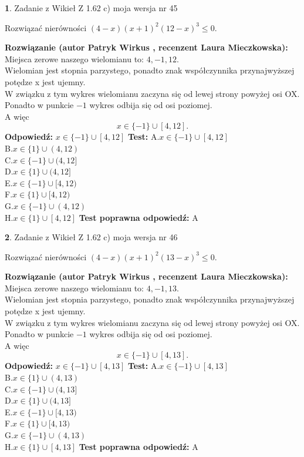 \documentclass[12pt, a4paper]{article}
\theoremstyle{definition} %
\newtheorem{zad}{}
\newcommand{\zadStart}[1]{\begin{zad}#1\newline}
\newcommand{\zadStop}{\end{zad}}
\newcommand{\rozwStart}[2]{\noindent \textbf{Rozwiązanie (autor #1 , recenzent #2): }\newline}
\newcommand{\rozwStop}{\newline}
\newcommand{\odpStart}{\noindent \textbf{Odpowiedź:}\newline}
\newcommand{\odpStop}{\newline}
\newcommand{\testStart}{\noindent \textbf{Test:}\newline}
\newcommand{\testStop}{\newline}
\newcommand{\kluczStart}{\noindent \textbf{Test poprawna odpowiedź:}\newline}
\newcommand{\kluczStop}{\newline}
\begin{document}
\zadStart{Zadanie z Wikieł Z 1.62 c) moja wersja nr 45}

Rozwiązać nierówności $(4-x)(x+1)^{2}(12-x)^{3}\le0$.
\zadStop
\rozwStart{Patryk Wirkus}{Laura Mieczkowska}
Miejsca zerowe naszego wielomianu to: $4, -1, 12$.\\
Wielomian jest stopnia parzystego, ponadto znak współczynnika przy\linebreak najwyższej potędze x jest ujemny.\\ W związku z tym wykres wielomianu zaczyna się od lewej strony powyżej osi OX.\\
Ponadto w punkcie $-1$ wykres odbija się od osi poziomej.\\
A więc $$x \in \{-1\} \cup [4,12].$$
\rozwStop
\odpStart
$x \in \{-1\} \cup [4,12]$
\odpStop
\testStart
A.$x \in \{-1\} \cup [4,12]$\\
B.$x \in \{1\} \cup (4,12)$\\
C.$x \in \{-1\} \cup (4,12]$\\
D.$x \in \{1\} \cup (4,12]$\\
E.$x \in \{-1\} \cup [4,12)$\\
F.$x \in \{1\} \cup [4,12)$\\
G.$x \in \{-1\} \cup (4,12)$\\
H.$x \in \{1\} \cup [4,12]$
\testStop
\kluczStart
A
\kluczStop



\zadStart{Zadanie z Wikieł Z 1.62 c) moja wersja nr 46}

Rozwiązać nierówności $(4-x)(x+1)^{2}(13-x)^{3}\le0$.
\zadStop
\rozwStart{Patryk Wirkus}{Laura Mieczkowska}
Miejsca zerowe naszego wielomianu to: $4, -1, 13$.\\
Wielomian jest stopnia parzystego, ponadto znak współczynnika przy\linebreak najwyższej potędze x jest ujemny.\\ W związku z tym wykres wielomianu zaczyna się od lewej strony powyżej osi OX.\\
Ponadto w punkcie $-1$ wykres odbija się od osi poziomej.\\
A więc $$x \in \{-1\} \cup [4,13].$$
\rozwStop
\odpStart
$x \in \{-1\} \cup [4,13]$
\odpStop
\testStart
A.$x \in \{-1\} \cup [4,13]$\\
B.$x \in \{1\} \cup (4,13)$\\
C.$x \in \{-1\} \cup (4,13]$\\
D.$x \in \{1\} \cup (4,13]$\\
E.$x \in \{-1\} \cup [4,13)$\\
F.$x \in \{1\} \cup [4,13)$\\
G.$x \in \{-1\} \cup (4,13)$\\
H.$x \in \{1\} \cup [4,13]$
\testStop
\kluczStart
A
\kluczStop
\end{document}
